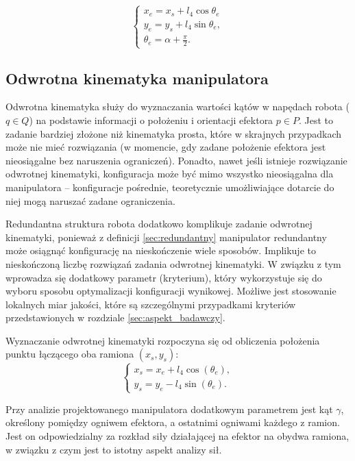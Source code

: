 \documentclass[printmode]{mgr}
\begin{document}
\begin{equation}
\begin{cases}
x_e = x_s + l_4\cos\theta_e\\
y_e = y_s + l_4\sin\theta_e,\\
\theta_e =  \alpha + \frac{\pi}{2}.
\end{cases}
\label{eq:kinematyka_prosta3}
\end{equation}

\subsection{Odwrotna kinematyka manipulatora}\label{sec:odwrotna_kinematyka}
Odwrotna kinematyka służy do wyznaczania wartości kątów w napędach robota ($q \in Q$) na podstawie informacji o 
położeniu i orientacji efektora $p \in P$. Jest to zadanie bardziej złożone niż kinematyka prosta, które w skrajnych przypadkach
może nie mieć rozwiązania (w momencie, gdy zadane położenie efektora jest nieosiągalne bez naruszenia ograniczeń). 
Ponadto, nawet jeśli istnieje rozwiązanie odwrotnej kinematyki, konfiguracja może być mimo wszystko nieosiągalna dla manipulatora
-- konfiguracje pośrednie, teoretycznie umożliwiające dotarcie do niej mogą naruszać zadane ograniczenia.

Redundantna struktura robota dodatkowo komplikuje zadanie odwrotnej kinematyki, ponieważ z definicji \ref{sec:redundantny}
manipulator redundantny może osiągnąć konfigurację na nieskończenie wiele sposobów. Implikuje to nieskończoną
liczbę rozwiązań zadania odwrotnej kinematyki. W związku z tym wprowadza się dodatkowy parametr (kryterium), który
wykorzystuje się do wyboru sposobu optymalizacji konfiguracji wynikowej. Możliwe jest stosowanie lokalnych miar jakości, które są szczególnymi
przypadkami kryteriów przedstawionych w rozdziale \ref{sec:aspekt_badawczy}. 

Wyznaczanie odwrotnej kinematyki rozpoczyna się od obliczenia położenia punktu łączącego oba ramiona $(x_s, y_s)$:
\begin{equation}
\begin{cases}
x_s = x_e + l_4\cos(\theta_e),\\
y_s = y_e - l_4\sin(\theta_e).
\end{cases}
\label{eq:kinematyka_odwrotna2}
\end{equation}

Przy analizie projektowanego manipulatora dodatkowym parametrem jest kąt $\gamma$, określony pomiędzy ogniwem efektora, 
a ostatnimi ogniwami każdego z ramion.
Jest on odpowiedzialny za rozkład siły działającej na efektor na obydwa ramiona, w związku z czym jest to istotny aspekt analizy sił.
\end{document}
